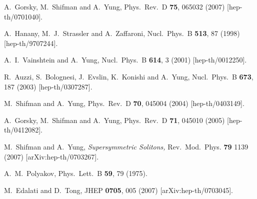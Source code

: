 \documentclass[12pt]{article}
\begin{document}
%
%
\small
\begin{thebibliography}{99}
\itemsep -2pt


A.~Gorsky, M.~Shifman and A.~Yung,
Phys.\ Rev.\  D {\bf 75}, 065032 (2007)
  [hep-th/0701040].

A.~Hanany, M.~J.~Strassler and A.~Zaffaroni,
Nucl.\ Phys.\ B {\bf 513}, 87 (1998)
[hep-th/9707244].

A.~I.~Vainshtein and A.~Yung,
Nucl.\ Phys.\ B {\bf 614}, 3 (2001)
[hep-th/0012250].

R.~Auzzi, S.~Bolognesi, J.~Evslin, K.~Konishi and A.~Yung,
Nucl.\ Phys.\ B {\bf 673}, 187 (2003)
[hep-th/0307287].

M.~Shifman and A.~Yung,
Phys.\ Rev.\ D {\bf 70}, 045004 (2004)
[hep-th/0403149].

A.~Gorsky, M.~Shifman and A.~Yung,
  Phys.\ Rev.\ D {\bf 71}, 045010 (2005)
  [hep-th/0412082].

M.~Shifman and A.~Yung,
{\sl Supersymmetric Solitons,}
Rev.\ Mod.\ Phys. {\bf 79} 1139 (2007)
[arXiv:hep-th/0703267].

A.~M.~Polyakov,
Phys.\ Lett.\ B {\bf 59}, 79 (1975).

  M.~Edalati and D.~Tong,
  JHEP {\bf 0705}, 005 (2007)
  [arXiv:hep-th/0703045].


\end{thebibliography}
\end{document}
